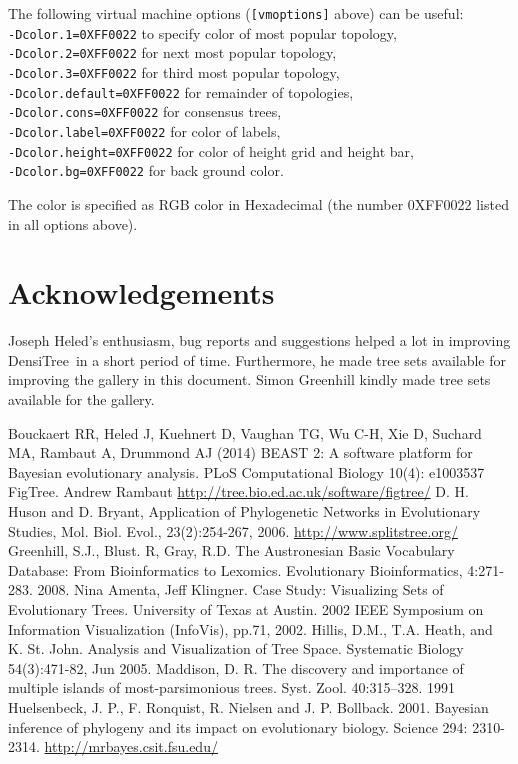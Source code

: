 \documentclass{article}
\def\DensiTree{DensiTree}
\begin{document}
The following virtual machine options ({\tt [vmoptions]} above) can be useful:\\
{\tt -Dcolor.1=0XFF0022} to specify color of most popular topology,\\
{\tt -Dcolor.2=0XFF0022} for next most  popular topology,\\
{\tt -Dcolor.3=0XFF0022} for third most popular topology,\\
{\tt -Dcolor.default=0XFF0022} for remainder of topologies,\\
{\tt -Dcolor.cons=0XFF0022} for consensus trees,\\
{\tt -Dcolor.label=0XFF0022} for color of labels,\\
{\tt -Dcolor.height=0XFF0022} for color of height grid and height bar,\\
{\tt -Dcolor.bg=0XFF0022} for back ground color.

The color is specified as RGB color in Hexadecimal (the number 0XFF0022 listed
in all options above).


\newpage
\section{Acknowledgements}

Joseph Heled's enthusiasm, bug reports and suggestions helped a lot in improving
\DensiTree\ in a short period of time. Furthermore, he made tree sets available for
improving the gallery in this document. Simon Greenhill kindly made tree sets available 
for the gallery.


\begin{thebibliography}{1}
Bouckaert RR, Heled J, Kuehnert D, Vaughan TG, Wu C-H, Xie D, Suchard MA,
Rambaut A, Drummond AJ (2014) BEAST 2: A software platform for Bayesian
evolutionary analysis. PLoS Computational Biology 10(4): e1003537
FigTree. Andrew Rambaut
\url{http://tree.bio.ed.ac.uk/software/figtree/}
D. H. Huson and D. Bryant, Application of Phylogenetic Networks in Evolutionary Studies, Mol. Biol. Evol., 23(2):254-267, 2006.
\url{http://www.splitstree.org/}
Greenhill, S.J., Blust. R, Gray, R.D. The Austronesian Basic Vocabulary Database: From Bioinformatics to Lexomics. Evolutionary Bioinformatics, 4:271-283. 2008.
Nina Amenta, Jeff Klingner.
Case Study: Visualizing Sets of Evolutionary Trees.
University of Texas at Austin.
2002 IEEE Symposium on Information Visualization (InfoVis), pp.71, 2002.
Hillis, D.M., T.A. Heath, and K. St. John.
Analysis and Visualization of Tree Space. 
Systematic Biology 54(3):471-82, Jun 2005.
Maddison, D. R. 
The discovery and importance of multiple islands of most-parsimonious trees. 
Syst. Zool. 40:315–328. 1991
Huelsenbeck, J. P., F. Ronquist, R. Nielsen and J. P. Bollback. 2001. Bayesian inference of phylogeny and its impact on evolutionary biology. Science 294: 2310-2314.
\url{http://mrbayes.csit.fsu.edu/}
\end{thebibliography}
\end{document}
